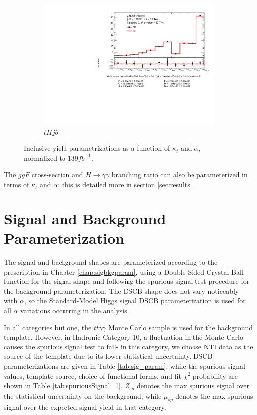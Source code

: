 \begin{figure}[htp]
\begin{subfigure}[b]{0.3\textwidth}
         \includegraphics[width=\textwidth]{figures/tthcp_results/yield_tHjb_0.pdf}
         \caption{$tHjb$}
         \label{fig:tHjbYield}
     \end{subfigure}
     \hfill
  \label{fig:YieldParams}
  \caption{Inclusive yield parametrizations as a function of $\kappa_{t}$ and $\alpha$, normalized to $139 fb^{-1}$.}  
\end{figure}


The $ggF$ cross-section and $H \rightarrow \gamma \gamma$ branching ratio can also be parameterized in terms of $\kappa_{t}$ and $\alpha$; this is detailed more in section \ref{sec:results}

\section{Signal and Background Parameterization}

The signal and background shapes are parameterized according to the prescription in Chapter \ref{chap:sigbkgparam}, using a Double-Sided Crystal Ball function for the signal shape and following the spurious signal test procedure for the background parameterization. The DSCB shape does not vary noticeably with $\alpha$, so the Standard-Model Higgs signal DSCB parameterization is used for all $\alpha$ variations occurring in the analysis.

In all categories but one, the $tt\gamma\gamma$ Monte Carlo sample is used for the background template. However, in Hadronic Category 10, a fluctuation in the Monte Carlo causes the spurious signal test to fail- in this category, we choose NTI data as the source of the template due to its lower statistical uncertainty. DSCB parameterizations are given in Table \ref{tab:sig_param}, while the spurious signal values, template source, choice of functional forms, and fit $\chi^{2}$ probability are shown in Table \ref{tab:spuriousSignal_1}. $Z_{sp}$ denotes the max spurious signal over the statistical uncertainty on the background, while $\mu_{sp}$ denotes the max spurious signal over the expected signal yield in that category.

